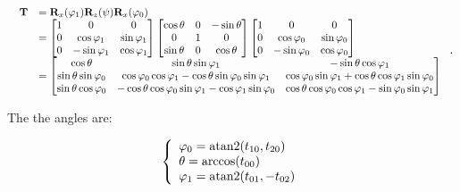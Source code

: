     \begin{equation}
        \scalebox{0.85}{
            $ \begin{array}{ll}
                \mathbf{T}
                &= \mathbf{R}_{x}(\varphi_1)\mathbf{R}_{z}(\psi)\mathbf{R}_{x}(\varphi_0) \\
                &=
                \begin{bmatrix}
                    1 & 0 & 0 \\
                    0 & \cos \varphi_1 & \sin \varphi_1 \\
                    0 & -\sin \varphi_1 & \cos \varphi_1
                \end{bmatrix}
                \begin{bmatrix}
                    \cos \theta & 0 & -\sin \theta \\
                    0 & 1 & 0 \\
                    \sin \theta & 0 & \cos \theta
                \end{bmatrix}
                \begin{bmatrix}
                    1 & 0 & 0 \\
                    0 & \cos \varphi_0 & \sin \varphi_0 \\
                    0 & -\sin \varphi_0 & \cos \varphi_0
                \end{bmatrix} \\
                &=
                \begin{bmatrix}
                    \cos \theta
                    &  \sin \theta \sin \varphi_1
                    & -\sin \theta \cos \varphi_1 \\
                    \sin \theta \sin \varphi_0
                    & \cos \varphi_0 \cos \varphi_1 - \cos \theta \sin \varphi_0 \sin \varphi_1
                    & \cos \varphi_0 \sin \varphi_1 + \cos \theta \cos \varphi_1 \sin \varphi_0 \\
                    \sin \theta \cos \varphi_0
                    & -\cos \theta \cos \varphi_0 \sin \varphi_1 - \cos \varphi_1 \sin \varphi_0
                    & \cos \theta \cos \varphi_0 \cos \varphi_1 - \sin \varphi_0 \sin \varphi_1
                \end{bmatrix}
            \end{array} $
        }
    .\end{equation}

    The the angles are:

    \begin{equation}
        \left\{ \begin{array}{l}
            \varphi_0 = \operatorname{atan2}(t_{10}, t_{20}) \\
            \theta = \arccos(t_{00}) \\
            \varphi_1 = \operatorname{atan2}(t_{01}, -t_{02})
        \end{array} \right.
    \end{equation}

